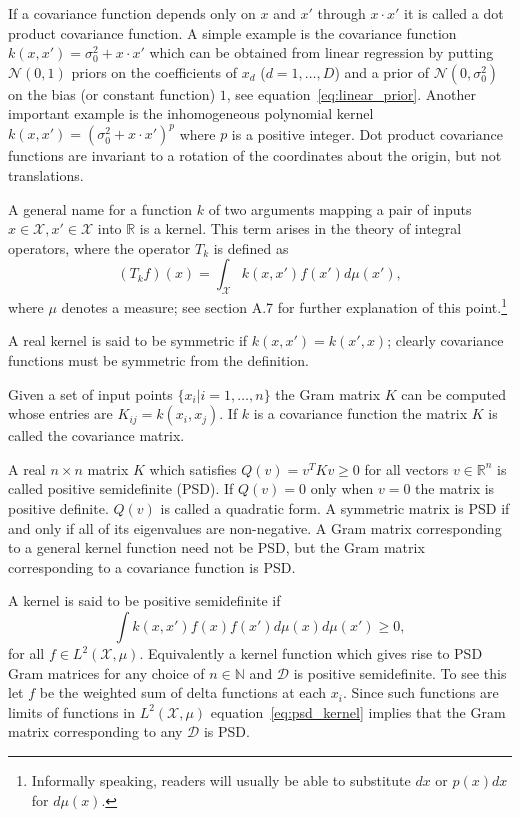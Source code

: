 \documentclass[11pt]{book}
\begin{document}
If a covariance function depends only on $x$ and $x'$ through $x \cdot x'$ it is called a dot product covariance function. A simple example is the covariance function $k(x, x') = \sigma_0^2 + x \cdot x'$ which can be obtained from linear regression by putting $\mathcal{N}(0, 1)$ priors on the coefficients of $x_d$ ($d = 1, \ldots, D$) and a prior of $\mathcal{N}(0, \sigma_0^2)$ on the bias (or constant function) $1$, see equation~\eqref{eq:linear_prior}. Another important example is the inhomogeneous polynomial kernel $k(x, x') = (\sigma_0^2 + x \cdot x')^p$ where $p$ is a positive integer. Dot product covariance functions are invariant to a rotation of the coordinates about the origin, but not translations.

A general name for a function $k$ of two arguments mapping a pair of inputs $x \in \mathcal{X}, x' \in \mathcal{X}$ into $\mathbb{R}$ is a kernel. This term arises in the theory of integral operators, where the operator $T_k$ is defined as
\begin{equation}
\label{eq:integral_operator}
(T_k f)(x) = \int_{\mathcal{X}} k(x, x') f(x') d\mu(x'),
\end{equation}
where $\mu$ denotes a measure; see section A.7 for further explanation of this point.\footnote{Informally speaking, readers will usually be able to substitute $dx$ or $p(x)dx$ for $d\mu(x)$.}

A real kernel is said to be symmetric if $k(x, x') = k(x', x)$; clearly covariance functions must be symmetric from the definition.

Given a set of input points $\{x_i | i = 1, \ldots, n\}$ the Gram matrix $K$ can be computed whose entries are $K_{ij} = k(x_i, x_j)$. If $k$ is a covariance function the matrix $K$ is called the covariance matrix.

A real $n \times n$ matrix $K$ which satisfies $Q(v) = v^T K v \geq 0$ for all vectors $v \in \mathbb{R}^n$ is called positive semidefinite (PSD). If $Q(v) = 0$ only when $v = 0$ the matrix is positive definite. $Q(v)$ is called a quadratic form. A symmetric matrix is PSD if and only if all of its eigenvalues are non-negative. A Gram matrix corresponding to a general kernel function need not be PSD, but the Gram matrix corresponding to a covariance function is PSD.

A kernel is said to be positive semidefinite if
\begin{equation}
\label{eq:psd_kernel}
\int k(x, x') f(x) f(x') d\mu(x) d\mu(x') \geq 0,
\end{equation}
for all $f \in L^2(\mathcal{X}, \mu)$. Equivalently a kernel function which gives rise to PSD Gram matrices for any choice of $n \in \mathbb{N}$ and $\mathcal{D}$ is positive semidefinite. To see this let $f$ be the weighted sum of delta functions at each $x_i$. Since such functions are limits of functions in $L^2(\mathcal{X}, \mu)$ equation~\eqref{eq:psd_kernel} implies that the Gram matrix corresponding to any $\mathcal{D}$ is PSD.
\end{document}
